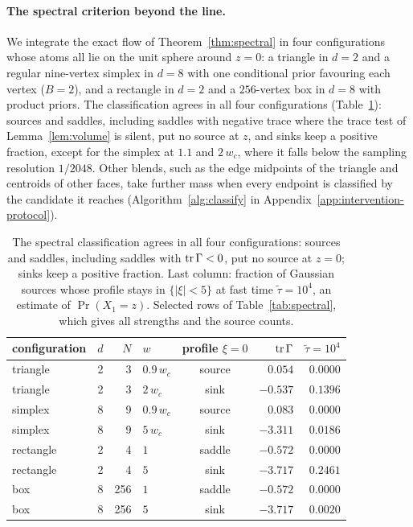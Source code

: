 \documentclass{article} %
\theoremstyle{plain}
\theoremstyle{definition}
\theoremstyle{remark}
\begin{document}
\paragraph{The spectral criterion beyond the line.} We integrate the exact flow of
Theorem~\ref{thm:spectral} in four configurations whose atoms all lie on the unit sphere around
$z=0$: a triangle in $d=2$ and a regular nine-vertex simplex in $d=8$ with one conditional prior
favouring each vertex ($B=2$), and a rectangle in $d=2$ and a $256$-vertex box in $d=8$ with
product priors. The classification agrees in all four configurations
(Table~\ref{tab:spectral-main}): sources and saddles, including saddles with negative trace where
the trace test of Lemma~\ref{lem:volume} is silent, put no source at $z$, and sinks keep a
positive fraction, except for the simplex at $1.1$ and $2\,w_c$, where it falls below the
sampling resolution $1/2048$. Other blends, such as the edge midpoints of the triangle and centroids of other
faces, take further mass when every endpoint is classified by the candidate it reaches
(Algorithm~\ref{alg:classify} in Appendix~\ref{app:intervention-protocol}).

\begin{table}[t]
\centering\small
\begin{tabular}{@{}lrrlcrr@{}}
\toprule
configuration & $d$ & $N$ & $w$ & profile $\xi=0$ & $\operatorname{tr}\Gamma$ & $\tilde\tau=10^4$\\
\midrule
triangle & 2 & 3 & $0.9\,w_c$ & source & $0.054$ & $0.0000$\\
triangle & 2 & 3 & $2\,w_c$ & sink & $-0.537$ & $0.1396$\\
simplex & 8 & 9 & $0.9\,w_c$ & source & $0.083$ & $0.0000$\\
simplex & 8 & 9 & $5\,w_c$ & sink & $-3.311$ & $0.0186$\\
rectangle & 2 & 4 & $1$ & saddle & $-0.572$ & $0.0000$\\
rectangle & 2 & 4 & $5$ & sink & $-3.717$ & $0.2461$\\
box & 8 & 256 & $1$ & saddle & $-0.572$ & $0.0000$\\
box & 8 & 256 & $5$ & sink & $-3.717$ & $0.0020$\\
\bottomrule
\end{tabular}
\caption{The spectral classification agrees in all four configurations: sources and saddles,
including saddles with $\operatorname{tr}\Gamma<0$, put no source at $z=0$; sinks keep a positive fraction.
Last column: fraction of Gaussian sources whose profile stays in $\{|\xi|<5\}$ at fast time
$\tilde\tau=10^4$, an estimate of $\Pr(X_1=z)$. Selected rows of Table~\ref{tab:spectral}, which
gives all strengths and the source counts.}
\label{tab:spectral-main}
\end{table}
\end{document}
